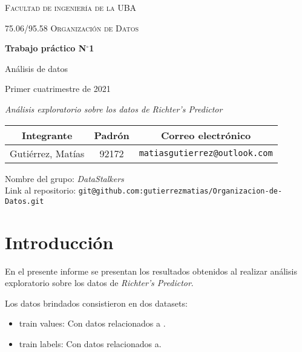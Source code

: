 \documentclass[a4paper,12pt]{article}
\newcommand\BackImage[2][scale=1]{%
\BgThispage
\backgroundsetup{
  contents={\texttt{[image: \#2]}}
  }
}
\begin{document}

\BackImage[width=.5\textwidth]{imagenes/logofiuba.png}%
\begin{titlepage}
	\centering	
	\vspace{1cm}
	{\scshape\LARGE Facultad de ingeniería de la UBA\par}
	\vspace{1cm}
	{\scshape\Large 75.06/95.58 Organización de Datos\par}
	\vspace{1.5cm}
	{\huge\bfseries Trabajo práctico N$^\circ$1 \par Análisis de datos\par }
	\vspace{1cm}
	{Primer cuatrimestre de 2021\par}
	\vspace{2cm}
	{\Large\itshape Análisis exploratorio sobre los datos de \textit{Richter's Predictor}\par}
	\vfill

\begin{table}[H]
\label{tabla:integrantes}
\begin{tabular}{|c|c|c|}
\hline
Integrante & Padrón & Correo electrónico\\
\hline
Gutiérrez, Matías & 92172 & \texttt{matiasgutierrez@outlook.com}\\

\hline
\end{tabular}
\label{table:mediciones}
\end{table}	
	
	
	\vfill

	{\large Nombre del grupo: \textit{DataStalkers}\\
	Link al repositorio: \texttt{git@github.com:gutierrezmatias/Organizacion-de-Datos.git}\\
	
	}

\end{titlepage}

\tableofcontents

\newpage


\part{Introducción}
\par
En el presente informe se presentan los resultados obtenidos al realizar análisis exploratorio sobre los datos de  \textit{Richter's Predictor}. 
\par
Los datos brindados consistieron en dos datasets:
\begin{itemize}
    \item train values: Con datos relacionados a .
    \item train labels: Con datos relacionados a.
\end{itemize}
\end{document}

